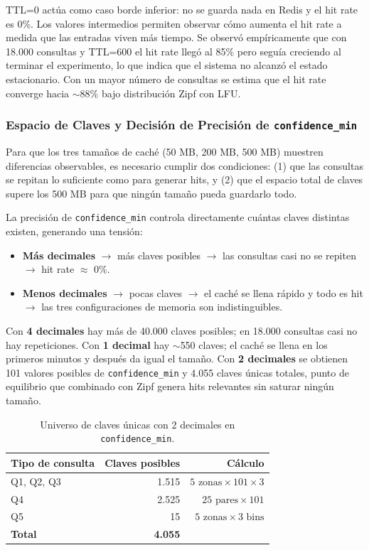 \documentclass[letter,12pt]{article}
\begin{document}
TTL=0 actúa como caso borde inferior: no se guarda nada en Redis y el hit rate es 0\%.
Los valores intermedios permiten observar cómo aumenta el hit rate a medida que las
entradas viven más tiempo. Se observó empíricamente que con 18.000 consultas y TTL=600
el hit rate llegó al 85\% pero seguía creciendo al terminar el experimento, lo que
indica que el sistema no alcanzó el estado estacionario. Con un mayor número de consultas
se estima que el hit rate converge hacia $\sim$88\% bajo distribución Zipf con LFU.

\subsubsection{Espacio de Claves y Decisión de Precisión de \texttt{confidence\_min}}

Para que los tres tamaños de caché (50 MB, 200 MB, 500 MB) muestren diferencias
observables, es necesario cumplir dos condiciones: (1) que las consultas se repitan
lo suficiente como para generar hits, y (2) que el espacio total de claves supere
los 500 MB para que ningún tamaño pueda guardarlo todo.

La precisión de \texttt{confidence\_min} controla directamente cuántas claves distintas
existen, generando una tensión:

\begin{itemize}
    \item \textbf{Más decimales} $\rightarrow$ más claves posibles $\rightarrow$ las consultas casi no se repiten $\rightarrow$ hit rate $\approx$ 0\%.
    \item \textbf{Menos decimales} $\rightarrow$ pocas claves $\rightarrow$ el caché se llena rápido y todo es hit $\rightarrow$ las tres configuraciones de memoria son indistinguibles.
\end{itemize}

Con \textbf{4 decimales} hay más de 40.000 claves posibles; en 18.000 consultas casi
no hay repeticiones. Con \textbf{1 decimal} hay $\sim$550 claves; el caché se llena en
los primeros minutos y después da igual el tamaño. Con \textbf{2 decimales} se obtienen
101 valores posibles de \texttt{confidence\_min} y 4.055 claves únicas totales, punto
de equilibrio que combinado con Zipf genera hits relevantes sin saturar ningún tamaño.

\begin{table}[H]
\centering
\begin{tabular}{lrr}
\toprule
\textbf{Tipo de consulta} & \textbf{Claves posibles} & \textbf{Cálculo} \\
\midrule
Q1, Q2, Q3 & 1.515 & $5 \text{ zonas} \times 101 \times 3$ \\
Q4          & 2.525 & $25 \text{ pares} \times 101$ \\
Q5          & 15    & $5 \text{ zonas} \times 3 \text{ bins}$ \\
\midrule
\textbf{Total} & \textbf{4.055} & \\
\bottomrule
\end{tabular}
\caption{Universo de claves únicas con 2 decimales en \texttt{confidence\_min}.}
\end{table}
\end{document}
